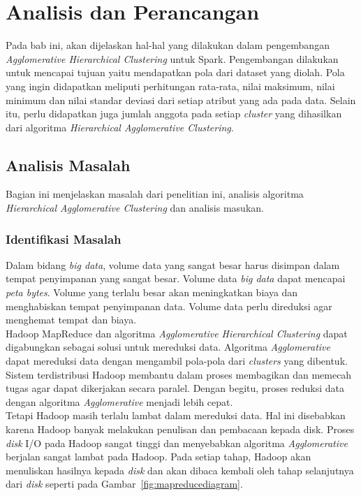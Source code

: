 \chapter{Analisis dan Perancangan}
\label{chap:Analisis dan Perancangan}

Pada bab ini, akan dijelaskan hal-hal yang dilakukan dalam pengembangan \textit{Agglomerative Hierarchical Clustering} untuk Spark. Pengembangan dilakukan untuk mencapai tujuan yaitu mendapatkan pola dari dataset yang diolah. Pola yang ingin didapatkan meliputi perhitungan rata-rata, nilai maksimum, nilai minimum dan nilai standar deviasi dari setiap atribut yang ada pada data. Selain itu, perlu didapatkan juga jumlah anggota pada setiap \textit{cluster} yang dihasilkan dari algoritma \textit{Hierarchical Agglomerative Clustering}.


\section{Analisis Masalah}

Bagian ini menjelaskan masalah dari penelitian ini, analisis algoritma \textit{Hierarchical Agglomerative Clustering} dan analisis masukan. 

\subsection{Identifikasi Masalah}

Dalam bidang \textit{big data}, volume data yang sangat besar harus disimpan dalam tempat penyimpanan yang sangat besar. Volume data \textit{big data} dapat mencapai \textit{peta bytes}. Volume yang terlalu besar akan meningkatkan biaya dan menghabiskan tempat penyimpanan data. Volume data perlu direduksi agar menghemat tempat dan biaya.\\ 

Hadoop MapReduce dan algoritma \textit{Agglomerative Hierarchical Clustering} dapat digabungkan sebagai solusi untuk mereduksi data. Algoritma \textit{Agglomerative} dapat mereduksi data dengan mengambil pola-pola dari \textit{clusters} yang dibentuk. Sistem terdistribusi Hadoop membantu dalam proses membagikan dan memecah tugas agar dapat dikerjakan secara paralel.  Dengan begitu, proses reduksi data dengan algoritma \textit{Agglomerative} menjadi lebih cepat. \\

Tetapi Hadoop masih terlalu lambat dalam mereduksi data. Hal ini disebabkan karena Hadoop banyak melakukan penulisan dan pembacaan kepada disk. Proses \textit{disk} I/O pada Hadoop sangat tinggi dan menyebabkan algoritma \textit{Agglomerative} berjalan sangat lambat pada Hadoop. Pada setiap tahap, Hadoop akan menuliskan hasilnya kepada \textit{disk} dan akan dibaca kembali oleh tahap selanjutnya dari \textit{disk} seperti pada Gambar~\ref{fig:mapreducediagram}.\\

